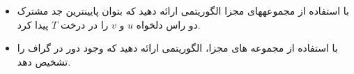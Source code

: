 \begin{itemize}
\item 
با استفاده از مجموعههای مجزا الگوریتمی ارائه دهید که بتوان پایینترین جد مشترک دو راس دلخواه $u$ و $v$ را در
درخت $T$ پیدا کرد.

\item 
با استفاده از مجموعه های مجزا، الگوریتمی ارائه دهید که وجود دور در گراف را تشخیص دهد.

\end{itemize}
